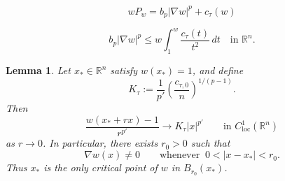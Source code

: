 \documentclass[10pt,a4paper]{amsart}
\newtheorem{lem}{Lemma}
\newcommand{\R}{\mathbb R}
\newcommand{\dd}{\,d}
\newcommand{\loc}{\mathrm{loc}}
\begin{document}
\begin{equation}\label{eq:transformed-equation}
wP_w=b_p|\nabla w|^p+c_\tau(w)
\end{equation}

\begin{equation}\label{eq:sharp-gradient-w}
b_p|\nabla w|^p \le w\int_1^w\frac{c_\tau(t)}{t^2}\dd t
\quad\text{in }\R^n.
\end{equation}

\begin{lem}\label{lem:unique-tangent}
Let $x_*\in\R^n$ satisfy $w(x_*)=1$, and define
\begin{equation}\label{eq:K-tau}
    K_\tau :=\frac1{p'}\left(\frac{c_{\tau,0}}n\right)^{1/(p-1)}.
\end{equation}
Then
\begin{equation}\label{eq:tangent-C1}
    \frac{w(x_*+rx)-1}{r^{p'}} \to K_\tau|x|^{p'} \qquad\text{in }C^1_{\loc}(\R^n)
\end{equation}
as $r\to 0$. In particular, there exists $r_0>0$ such that
$$
\nabla w(x)\ne0 \qquad \text{whenever }\ 0<|x-x_*|<r_0.
$$
Thus $x_*$ is the only critical point of $w$ in $B_{r_0}(x_*)$.
\end{lem}
\end{document}
